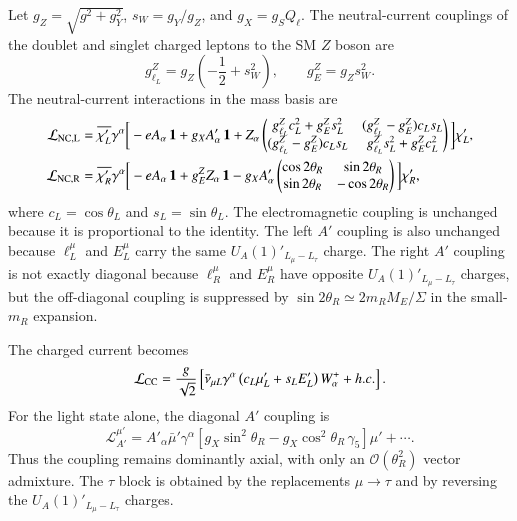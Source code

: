 \documentclass[onecolumn, aps, nofootinbib, prd, preprint, floats, floatfix, amsmath, amssymb, superscriptaddress, preprintnumbers]{revtex4-1}
\begin{document}
Let $g_Z=\sqrt{g^2+g_Y^2}$, $s_W=g_Y/g_Z$, and \(g_X=g_SQ_\ell\). The neutral-current couplings of the doublet and singlet charged leptons to the SM \(Z\) boson are
\begin{equation}
g_{\ell_L}^Z=g_Z\left(-\frac12+s_W^2\right),
\qquad
g_E^Z=g_Zs_W^2 .
\end{equation}
The neutral-current interactions in the mass basis are
\begin{equation}
\begin{aligned}
\mathcal{L}_{\rm NC,L}
=&\;
\overline{\chi'_L}\gamma^\alpha
\bigg[
-eA_\alpha\,\mathbf{1}
+g_XA'_\alpha\,\mathbf{1}
+Z_\alpha
\begin{pmatrix}
g_{\ell_L}^Z c_L^2+g_E^Z s_L^2
&
(g_{\ell_L}^Z-g_E^Z)c_Ls_L\\
(g_{\ell_L}^Z-g_E^Z)c_Ls_L
&
g_{\ell_L}^Z s_L^2+g_E^Z c_L^2
\end{pmatrix}
\bigg]\chi'_L,\\
\mathcal{L}_{\rm NC,R}
=&\;
\overline{\chi'_R}\gamma^\alpha
\bigg[
-eA_\alpha\,\mathbf{1}
+g_E^ZZ_\alpha\,\mathbf{1}
-g_XA'_\alpha
\begin{pmatrix}
\cos2\theta_R & \sin2\theta_R\\
\sin2\theta_R & -\cos2\theta_R
\end{pmatrix}
\bigg]\chi'_R,
\end{aligned}
\label{eq:mass-basis-NC}
\end{equation}
where $c_L=\cos\theta_L$ and $s_L=\sin\theta_L$. The electromagnetic coupling is unchanged because it is proportional to the identity. The left $A'$ coupling is also unchanged because $\ell_L^\mu$ and $E_L^\mu$ carry the same $U_A(1)'_{L_\mu-L_\tau}$ charge. The right $A'$ coupling is not exactly diagonal because $\ell_R^\mu$ and $E_R^\mu$ have opposite $U_A(1)'_{L_\mu-L_\tau}$ charges, but the off-diagonal coupling is suppressed by $\sin2\theta_R\simeq 2m_RM_E/\Sigma$ in the small-\(m_R\) expansion.

The charged current becomes
\begin{equation}
\mathcal{L}_{\rm CC}
=
\frac{g}{\sqrt2}
\left[
\bar\nu_{\mu L}\gamma^\alpha
\left(c_L\mu'_L+s_LE'_L\right)W^+_\alpha
+h.c.
\right].
\label{eq:mass-basis-CC}
\end{equation}
For the light state alone, the diagonal $A'$ coupling is
\begin{equation}
\mathcal{L}_{A'}^{\mu'}
=
A'_\alpha\bar\mu'\gamma^\alpha
\left[
g_X\sin^2\theta_R
-g_X\cos^2\theta_R\,\gamma_5
\right]\mu'
+\cdots .
\label{eq:light-muon-Apr}
\end{equation}
Thus the coupling remains dominantly axial, with only an $\mathcal{O}(\theta_R^2)$ vector admixture. The $\tau$ block is obtained by the replacements $\mu\to\tau$ and by reversing the $U_A(1)'_{L_\mu-L_\tau}$ charges.
\end{document}
